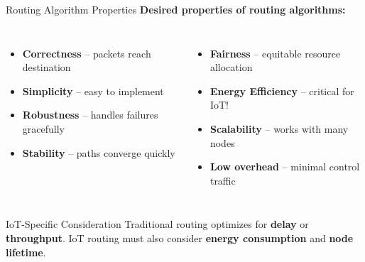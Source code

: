 \documentclass[aspectratio=169,11pt]{beamer}
\begin{document}
\begin{frame}{Routing Algorithm Properties}
    \textbf{Desired properties of routing algorithms:}
    
    \vspace{0.3cm}
    \begin{columns}
        \begin{itemize}
            \item \textbf{Correctness} -- packets reach destination
            \item \textbf{Simplicity} -- easy to implement
            \item \textbf{Robustness} -- handles failures gracefully
            \item \textbf{Stability} -- paths converge quickly
        \end{itemize}
        
        \begin{itemize}
            \item \textbf{Fairness} -- equitable resource allocation
            \item \textbf{Energy Efficiency} -- critical for IoT!
            \item \textbf{Scalability} -- works with many nodes
            \item \textbf{Low overhead} -- minimal control traffic
        \end{itemize}
    \end{columns}
    
    \vspace{0.5cm}
    \begin{alertblock}{IoT-Specific Consideration}
        Traditional routing optimizes for \textbf{delay} or \textbf{throughput}. IoT routing must also consider \textbf{energy consumption} and \textbf{node lifetime}.
    \end{alertblock}
\end{frame}
\end{document}
